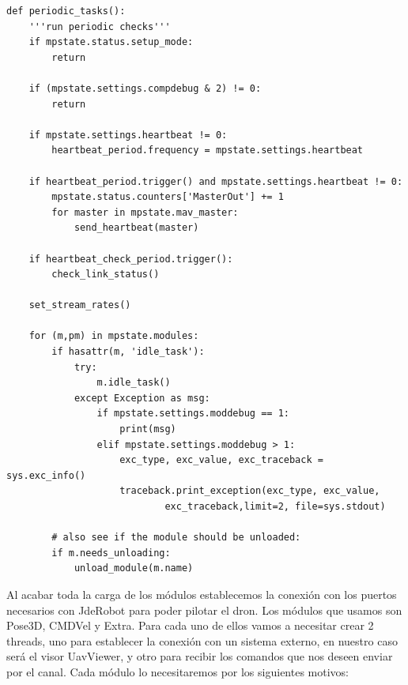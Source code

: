 \begin{lstlisting}[frame=single]
def periodic_tasks():
    '''run periodic checks'''
    if mpstate.status.setup_mode:
        return

    if (mpstate.settings.compdebug & 2) != 0:
        return

    if mpstate.settings.heartbeat != 0:
        heartbeat_period.frequency = mpstate.settings.heartbeat

    if heartbeat_period.trigger() and mpstate.settings.heartbeat != 0:
        mpstate.status.counters['MasterOut'] += 1
        for master in mpstate.mav_master:
            send_heartbeat(master)

    if heartbeat_check_period.trigger():
        check_link_status()

    set_stream_rates()

    for (m,pm) in mpstate.modules:
        if hasattr(m, 'idle_task'):
            try:
                m.idle_task()
            except Exception as msg:
                if mpstate.settings.moddebug == 1:
                    print(msg)
                elif mpstate.settings.moddebug > 1:
                    exc_type, exc_value, exc_traceback = sys.exc_info()
                    traceback.print_exception(exc_type, exc_value, 
                    		exc_traceback,limit=2, file=sys.stdout)

        # also see if the module should be unloaded:
        if m.needs_unloading:
            unload_module(m.name)
\end{lstlisting}
            
Al acabar toda la carga de los módulos establecemos la conexión con los puertos necesarios con JdeRobot para poder pilotar el dron. Los módulos que usamos son Pose3D, CMDVel y Extra. Para cada uno de ellos vamos a necesitar crear 2 threads, uno para establecer la conexión con un sistema externo, en nuestro caso será el visor UavViewer, y otro para recibir los comandos que nos deseen enviar por el canal. Cada módulo lo necesitaremos por los siguientes motivos:

